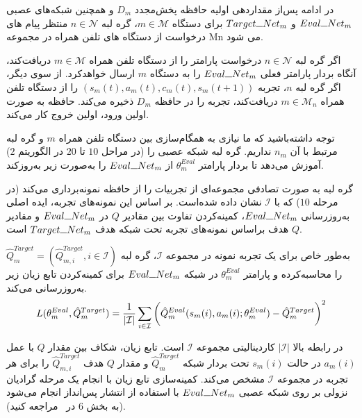 

در ادامه پس‌از مقداردهی اولیه حافظه پخش‌مجدد $D_m$ و همچنین شبکه‌های عصبی $Eval\rule{0.25cm}{0.15mm}Net_m$ و $Target\rule{0.25cm}{0.15mm}Net_m$ برای دستگاه $m \in \mathcal{M}$، گره لبه $n \in \mathcal{N}$ منتظر پیام های درخواست از دستگاه های تلفن همراه در مجموعه Mn می شود.


اگر گره لبه $n \in \mathcal{N}$ درخواست پارامتر را از دستگاه تلفن همراه $m \in \mathcal{M}$ دریافت‌کند، آنگاه بردار پارامتر فعلی $Eval\rule{0.25cm}{0.15mm}Net_m$ را به دستگاه $m$ ارسال خواهدکرد. از سوی دیگر، اگر گره لبه $n$، تجربه $(s_m(t), a_m(t), c_m(t), s_m(t+1))$ را از دستگاه تلفن همراه $m \in \mathcal{M}_n$ دریافت‌کند، تجربه را در حافظه $D_m$ ذخیره می‌کند. حافظه به صورت اولین ورود، اولین خروج کار می‌کند. 


توجه داشته‌باشید که ما نیازی به همگام‌سازی بین دستگاه تلفن همراه $m$ و گره لبه مرتبط با آن $n_m$ نداریم. گره لبه شبکه عصبی را (در مراحل $10$ تا $20$‌ در الگوریتم $2$) آموزش می‌دهد تا بردار پارامتر $\theta_m^{Eval}$ از $Eval\rule{0.25cm}{0.15mm}Net_m$ را به‌صورت زیر به‌روزکند. 


گره لبه به صورت تصادفی مجموعه‌ای از تجربیات را از حافظه نمونه‌برداری می‌کند (در مرحله $10$) که با $\mathcal{I}$ نشان داده شده‌است. بر اساس این نمونه‌های تجربه، ایده اصلی به‌روزرسانی $Eval\rule{0.25cm}{0.15mm}Net_m$، کمینه‌کردن تفاوت بین مقادیر $Q$ در $Eval\rule{0.25cm}{0.15mm}Net_m$ و مقادیر$Q$ هدف براساس نمونه‌های تجربه تحت شبکه هدف $Target\rule{0.25cm}{0.15mm}Net_m$ ‌است. 

به‌طور خاص برای یک تجربه نمونه در مجموعه $\mathcal{I}$، گره لبه $\hat{Q}_m^{Target} = (\hat{Q}_{m,i}^{Target} , i \in \mathcal{I})$ را محاسبه‌کرده و پارامتر $\theta_m^{Eval}$ در شبکه $Eval\rule{0.25cm}{0.15mm}Net_m$ برای کمینه‌کردن تابع زیان زیر به‌روزرسانی می‌کند.
\begin{alignat}{2}
	L(\theta_m^{Eval},\hat{Q}_m^{Target}) = {1 \over |\mathcal{I}| } \sum\limits_{i \in \mathcal{I}} \bigg(\hat{Q}_m^{Eval}(s_m(i) , a_m(i); \theta_m^{Eval} ) -   \hat{Q}_m^{Target}  \bigg)^2
	\label{63}  
\end{alignat}  





در رابطه بالا $|\mathcal{I}|$ کاردینالیتی مجموعه $\mathcal{I}$ است. تابع زیان، شکاف بین مقدار $Q$ با عمل $a_m(i)$ در حالت $s_m(i)$ تحت بردار شبکه $\hat{Q}_m^{Target}$ و مقدار $Q$ هدف $\hat{Q}_{m,i}^{Target}$ را برای هر تجربه در مجموعه $\mathcal{I}$ مشخص می‌کند. کمینه‌سازی تابع زیان با انجام یک مرحله گرادیان نزولی بر روی شبکه عصبی $Eval\rule{0.25cm}{0.15mm}Net_m$ با استفاده از انتشار پس‌انداز انجام می‌شود (به بخش 6 در~\cite{gers2000learning} مراجعه کنید).


